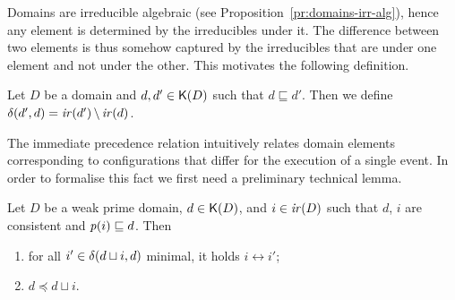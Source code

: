 
Domains are irreducible algebraic
(see Proposition~\ref{pr:domains-irr-alg}), hence any element is
determined by the irreducibles under it. The difference between two
elements is thus somehow captured by the irreducibles that are under
one element and not under the other.
%
This motivates the following definition.

\begin{definition}
  Let $D$ be a domain and $d, d' \in \mathop{\mathsf{K}({D})}$ such that
  $d \sqsubseteq d'$. Then we define
  $\delta({d'},{d}) = \mathop{\mathit{ir}({d'})} \setminus \mathop{\mathit{ir}({d})}$.
\end{definition}

The immediate precedence relation intuitively relates domain elements
corresponding to configurations that differ for the
execution of a single event.
%
In order to formalise this fact we first need a preliminary technical lemma.

\begin{lemma}
  \label{le:prec-irr-a}
  Let $D$ be a weak prime domain, $d \in \mathop{\mathsf{K}({D})}$, and $i \in \mathop{\mathit{ir}({D})}$
  such that $d$, $i$ are consistent and $\mathit{p}({i}) \sqsubseteq d$. Then
  \begin{enumerate}
  \item 
    \label{le:prec-irr-a:1}
    for all $i' \in \delta({d \sqcup i},{d})$ minimal, it holds
    $i \leftrightarrow i'$;
  \item 
    \label{le:prec-irr-a:2}
    $d \preceq d \sqcup i$.
  \end{enumerate}
\end{lemma}




